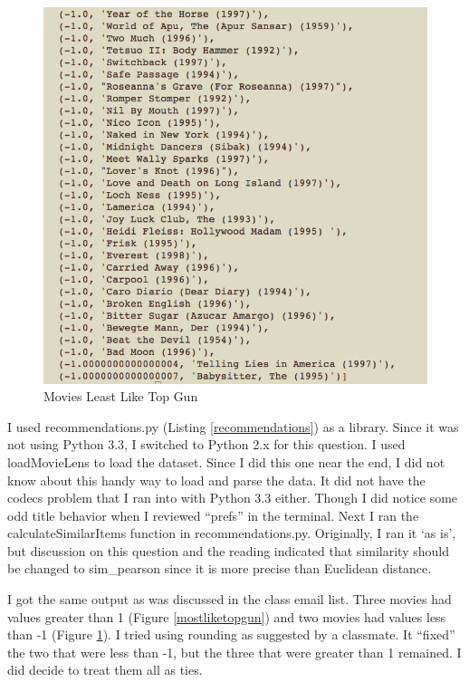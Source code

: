 \documentclass{article}
\begin{document}
\begin{figure}[H]
\centering
\includegraphics[scale=0.50]{q05/leastliketopgun}
\caption{Movies Least Like Top Gun}
\label{leastliketopgun}
\end{figure}

I used recommendations.py (Listing \ref{recommendations}) as a library. Since it was not using Python 3.3, I switched to Python 2.x for this question. I used loadMovieLens to load the dataset. Since I did this one near the end, I did not know about this handy way to load and parse the data. It did not have the codecs problem that I ran into with Python 3.3 either. Though I did notice some odd title behavior when I reviewed ``prefs'' in the terminal. Next I ran the calculateSimilarItems function in recommendations.py. Originally, I ran it `as is', but discussion on this question and the reading indicated that similarity should be changed to sim\_pearson since it is more precise than Euclidean distance. \cite{pci}

I got the same output as was discussed in the class email list. Three movies had values greater than 1 (Figure \ref{mostliketopgun}) and two movies had values less than -1 (Figure \ref{leastliketopgun}). I tried using rounding as suggested by a classmate. It ``fixed'' the two that were less than -1, but the three that were greater than 1 remained. I did decide to treat them all as ties.
\end{document}
